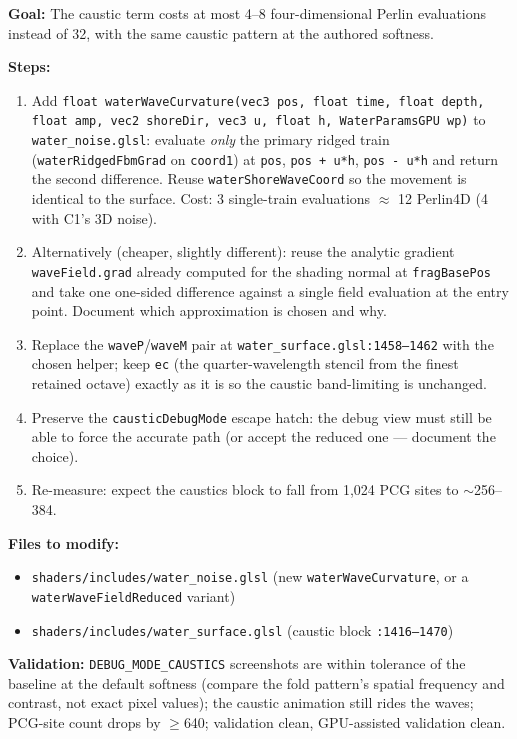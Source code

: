 \documentclass[11pt,a4paper]{article}
\begin{document}
\begin{tcolorbox}[promptbox={Prompt: Band-Limit the Caustic Curvature to One Reduced Field Evaluation}]
\textbf{Goal:} The caustic term costs at most 4--8 four-dimensional Perlin evaluations instead of 32, with the same
caustic pattern at the authored softness.

\textbf{Steps:}
\begin{enumerate}
    \item Add \texttt{float waterWaveCurvature(vec3 pos, float time, float depth, float amp, vec2 shoreDir, vec3 u,
    float h, WaterParamsGPU wp)} to \texttt{water\_noise.glsl}: evaluate \emph{only} the primary ridged train
    (\texttt{waterRidgedFbmGrad} on \texttt{coord1}) at \texttt{pos}, \texttt{pos + u*h}, \texttt{pos - u*h} and return
    the second difference. Reuse \texttt{waterShoreWaveCoord} so the movement is identical to the surface. Cost: 3
    single-train evaluations $\approx$ 12 Perlin4D (4 with C1's 3D noise).
    \item Alternatively (cheaper, slightly different): reuse the analytic gradient \texttt{waveField.grad} already
    computed for the shading normal at \texttt{fragBasePos} and take one one-sided difference against a single field
    evaluation at the entry point. Document which approximation is chosen and why.
    \item Replace the \texttt{waveP}/\texttt{waveM} pair at \texttt{water\_surface.glsl:1458--1462} with the chosen
    helper; keep \texttt{ec} (the quarter-wavelength stencil from the finest retained octave) exactly as it is so the
    caustic band-limiting is unchanged.
    \item Preserve the \texttt{causticDebugMode} escape hatch: the debug view must still be able to force the accurate
    path (or accept the reduced one --- document the choice).
    \item Re-measure: expect the caustics block to fall from 1,024 PCG sites to $\sim$256--384.
\end{enumerate}

\textbf{Files to modify:}
\begin{itemize}
    \item \texttt{shaders/includes/water\_noise.glsl} (new \texttt{waterWaveCurvature}, or a
    \texttt{waterWaveFieldReduced} variant)
    \item \texttt{shaders/includes/water\_surface.glsl} (caustic block \texttt{:1416--1470})
\end{itemize}

\textbf{Validation:} \texttt{DEBUG\_MODE\_CAUSTICS} screenshots are within tolerance of the baseline at the default
softness (compare the fold pattern's spatial frequency and contrast, not exact pixel values); the caustic animation
still rides the waves; PCG-site count drops by $\geq$640; validation clean, GPU-assisted validation clean.
\end{tcolorbox}
\end{document}
